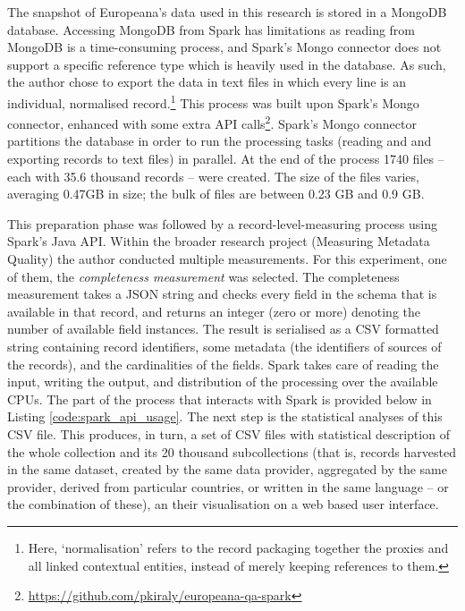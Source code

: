 The snapshot of Europeana’s data used in this research is stored in a MongoDB database. Accessing MongoDB from Spark has limitations as reading from MongoDB is a time-consuming process, and Spark's Mongo connector does not support a specific reference type which is heavily used in the database. As such, the author chose to export the data in text files in which every line is an individual, normalised record.\footnote{Here, `normalisation' refers to the record packaging together the proxies and all linked contextual entities, instead of merely keeping references to them.} This process was built upon Spark's Mongo connector, enhanced with some extra API calls\footnote{\url{https://github.com/pkiraly/europeana-qa-spark}}. Spark's Mongo connector partitions the database in order to run the processing tasks (reading and and exporting records to text files) in parallel. At the end of the process 1740 files -- each with 35.6 thousand records -- were created. The size of the files varies, averaging 0.47GB in size; the bulk of files are between 0.23 GB and 0.9 GB.

This preparation phase was followed by a record-level-measuring process using Spark's Java API. Within the broader research project (Measuring Metadata Quality) the author conducted multiple measurements. For this experiment, one of them, the \emph{completeness measurement} was selected. The completeness measurement takes a JSON string and checks every field in the schema that is available in that record, and returns an integer (zero or more) denoting the number of available field instances. The result is serialised as a CSV formatted string containing record identifiers, some metadata (the identifiers of sources of the records), and the cardinalities of the fields. Spark takes care of reading the input, writing the output, and distribution of the processing over the available CPUs. The part of the process that interacts with Spark is provided below in Listing \ref{code:spark_api_usage}. The next step is the statistical analyses of this CSV file. This produces, in turn, a set of CSV files with statistical description of the whole collection and its 20 thousand subcollections (that is, records harvested in the same dataset, created by the same data provider, aggregated by the same provider, derived from particular countries, or written in the same language -- or the combination of these), an their visualisation on a web based user interface.

